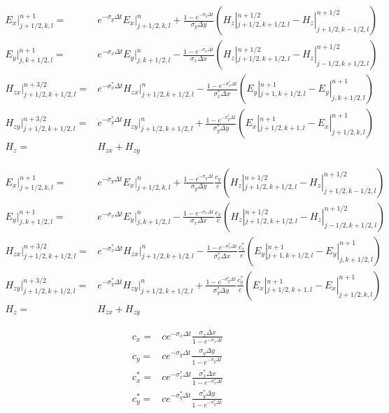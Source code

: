 %
\begin{subequations}
\begin{align}
E_x|^{n+1}_{j+1/2,k,l} = & e^{-\sigma_y\Delta t} E_x|^{n}_{j+1/2,k,l} + \frac{1-e^{-\sigma_y\Delta t}}{\sigma_y \Delta y} \left(H_z|^{n+1/2}_{j+1/2,k+1/2,l}-H_z|^{n+1/2}_{j+1/2,k-1/2,l}\right) \\
%
E_y|^{n+1}_{j,k+1/2,l} = & e^{-\sigma_x\Delta t} E_y|^{n}_{j,k+1/2,l} - \frac{1-e^{-\sigma_x\Delta t}}{\sigma_x \Delta x} \left(H_z|^{n+1/2}_{j+1/2,k+1/2,l}-H_z|^{n+1/2}_{j-1/2,k+1/2,l}\right) \\
%
H_{zx}|^{n+3/2}_{j+1/2,k+1/2,l} = & e^{-\sigma^*_x\Delta t} H_{zx}|^{n}_{j+1/2,k+1/2,l} - \frac{1-e^{-\sigma^*_x\Delta t}}{\sigma^*_x \Delta x} \left(E_y|^{n+1}_{j+1,k+1/2,l}-E_y|^{n+1}_{j,k+1/2,l}\right) \\
%
H_{zy}|^{n+3/2}_{j+1/2,k+1/2,l} = & e^{-\sigma^*_y\Delta t} H_{zy}|^{n}_{j+1/2,k+1/2,l} + \frac{1-e^{-\sigma^*_y\Delta t}}{\sigma^*_y \Delta y} \left(E_x|^{n+1}_{j+1/2,k+1,l}-E_x|^{n+1}_{j+1/2,k,l}\right) \\
%
H_z = & H_{zx}+H_{zy}
\end{align}
\end{subequations}


%
\begin{subequations}
\begin{align}
E_x|^{n+1}_{j+1/2,k,l} = & e^{-\sigma_y\Delta t} E_x|^{n}_{j+1/2,k,l} + \frac{1-e^{-\sigma_y\Delta t}}{\sigma_y \Delta y}\frac{c_y}{c} \left(H_z|^{n+1/2}_{j+1/2,k+1/2,l}-H_z|^{n+1/2}_{j+1/2,k-1/2,l}\right) \\
%
E_y|^{n+1}_{j,k+1/2,l} = & e^{-\sigma_x\Delta t} E_y|^{n}_{j,k+1/2,l} - \frac{1-e^{-\sigma_x\Delta t}}{\sigma_x \Delta x}\frac{c_x}{c} \left(H_z|^{n+1/2}_{j+1/2,k+1/2,l}-H_z|^{n+1/2}_{j-1/2,k+1/2,l}\right) \\
%
H_{zx}|^{n+3/2}_{j+1/2,k+1/2,l} = & e^{-\sigma^*_x\Delta t} H_{zx}|^{n}_{j+1/2,k+1/2,l} - \frac{1-e^{-\sigma^*_x\Delta t}}{\sigma^*_x \Delta x}\frac{c^*_x}{c} \left(E_y|^{n+1}_{j+1,k+1/2,l}-E_y|^{n+1}_{j,k+1/2,l}\right) \\
%
H_{zy}|^{n+3/2}_{j+1/2,k+1/2,l} = & e^{-\sigma^*_y\Delta t} H_{zy}|^{n}_{j+1/2,k+1/2,l} + \frac{1-e^{-\sigma^*_y\Delta t}}{\sigma^*_y \Delta y}\frac{c^*_y}{c} \left(E_x|^{n+1}_{j+1/2,k+1,l}-E_x|^{n+1}_{j+1/2,k,l}\right) \\
%
H_z = & H_{zx}+H_{zy}
\end{align}
\end{subequations}

\begin{subequations}
\begin{align}
c_x = & c e^{-\sigma_x\Delta t} \frac{\sigma_x \Delta x}{1-e^{-\sigma_x\Delta t}} \\
c_y = & c e^{-\sigma_y\Delta t} \frac{\sigma_y \Delta y}{1-e^{-\sigma_y\Delta t}} \\
c^*_x = & c e^{-\sigma^*_x\Delta t} \frac{\sigma^*_x \Delta x}{1-e^{-\sigma^*_x\Delta t}} \\
c^*_y = & c e^{-\sigma^*_y\Delta t} \frac{\sigma^*_y \Delta y}{1-e^{-\sigma^*_y\Delta t}} 
\end{align}
\end{subequations}

